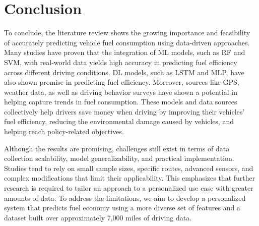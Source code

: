 \documentclass[letterpaper]{article}
\begin{document}

\section*{Conclusion}

To conclude, the literature review shows the growing importance and feasibility
of accurately predicting vehicle fuel consumption using data-driven approaches.
Many studies have proven that the integration of ML models, such as RF and SVM,
with real-world data yields high accuracy in predicting fuel efficiency across
different driving conditions. DL models, such as LSTM and MLP, have also shown
promise in predicting fuel efficiency. Moreover, sources like GPS, weather data,
as well as driving behavior surveys have shown a potential in helping capture
trends in fuel consumption. These models and data sources collectively help
drivers save money when driving by improving their vehicles' fuel efficiency,
reducing the environmental damage caused by vehicles, and helping reach
policy-related objectives. 

Although the results are promising, challenges still exist in terms of data collection 
scalability, model generalizability, and practical implementation. Studies tend to rely on 
small sample sizes, specific routes, advanced sensors, and complex modifications that limit 
their applicability. This emphasizes that further research is required to tailor an approach 
to a personalized use case with greater amounts of data. To address the limitations, we aim 
to develop a personalized system that predicts fuel economy using a more diverse set of 
features and a dataset built over approximately 7,000 miles of driving data.

 

\end{document}
